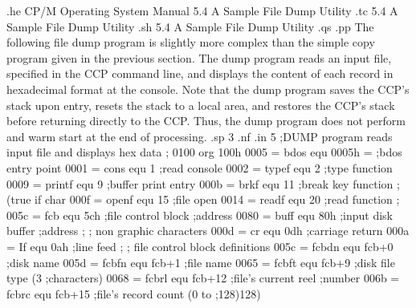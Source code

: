 .he CP/M Operating System Manual      5.4  A Sample File Dump Utility
.tc    5.4  A Sample File Dump Utility
.sh
5.4  A Sample File Dump Utility
.qs
.pp
The following file dump program is slightly more complex than 
the simple copy program given in the previous section.  The dump 
program reads an input file, specified in the CCP command line, 
and displays the content of each record in hexadecimal format at 
the console.  Note that the dump program saves the CCP's stack 
upon entry, resets the stack to a local area, and restores the 
CCP's stack before returning directly to the CCP.  Thus, the 
dump program does not perform and warm start at the end of 
processing.                                   
.sp 3
.nf
.in 5
                            ;DUMP program reads input file and displays 
                            hex data
                            ;  
0100                                 org  100h
0005 =                      bdos     equ  0005h =   ;bdos entry point
0001 =                      cons     equ  1         ;read console
0002 =                      typef    equ  2         ;type function
0009 =                      printf   equ  9         ;buffer print entry
000b =                      brkf     equ  11        ;break key function
                                                    ;(true if char
000f =                      openf    equ  15        ;file open
0014 =                      readf    equ  20        ;read function
                            ;
005c =                      fcb      equ  5ch       ;file control block
                                                    ;address
0080 =                      buff     equ  80h       ;input disk buffer
                                                    ;address
                            ;
                            ;        non graphic characters
000d =                      cr       equ  0dh       ;carriage return
000a =                      If       equ  0ah       ;line feed
                            ;
                            ;        file control block definitions
005c =                      fcbdn    equ  fcb+0     ;disk name
005d =                      fcbfn    equ  fcb+1     ;file name
0065 =                      fcbft    equ  fcb+9     ;disk file type (3
                                                    ;characters)
0068 =                      fcbrl    equ  fcb+12    ;file's current reel
                                                    ;number
006b =                      fcbrc    equ  fcb+15    ;file's record count (0 to
                                                    ;128)128)
